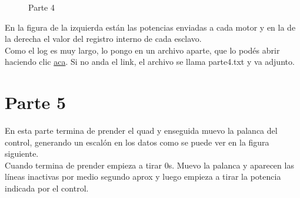 \documentclass[spanish,12pt,a4paper,titlepage]{report}
\begin{document}
\begin{figure}[h!]
  \centering
  \caption{Parte 4}
  \label{fig:parte4}
\end{figure}


En la figura de la izquierda están las potencias enviadas a cada motor y en la de la derecha el valor del registro interno de cada esclavo.\\

Como el log es muy largo, lo pongo en un archivo aparte, que lo podés abrir haciendo clic \href{parte4.txt}{aca}. Si no anda el link, el archivo se llama parte4.txt y va adjunto.

\section*{Parte 5}

En esta parte termina de prender el quad y enseguida muevo la palanca del control, generando un escalón en los datos como se puede ver en la figura siguiente.\\

Cuando termina de prender empieza a tirar 0s. Muevo la palanca y aparecen las líneas inactivas por medio segundo aprox y luego empieza a tirar la potencia indicada por el control.\\
\end{document}
